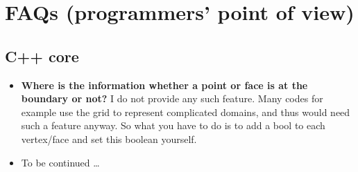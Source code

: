 \chapter{FAQs (programmers' point of view)}



% 
% 
% 
% 
% 
% 
% 



\section{C++ core}

\begin{itemize}
  \item \textbf{Where is the information whether a point or face is at the
  boundary or not?}
  I do not provide any such feature. Many codes for example use the grid to
  represent complicated domains, and thus would need such a feature anyway. So
  what you have to do is to add a bool to each vertex/face and set this boolean
  yourself.
  \item To be continued \dots
\end{itemize}


